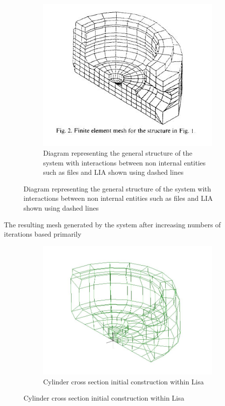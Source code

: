 \begin{figure}
\begin{subfigure}{.5\textwidth}
  \includegraphics[width=0.9\linewidth]{../Graphics/DolsakCylinderMeshed.jpeg}
  \caption{Diagram representing the general structure of the system with interactions between non internal entities such as files and LIA shown using dashed lines}
  \label{fig:sub2}
\end{subfigure}
\label{fig:test}
\end{figure}

The resulting mesh generated by the system after increasing numbers of iterations based primarily

\begin{figure}
\centering
\begin{subfigure}{.5\textwidth}
  \centering
  \includegraphics[width=0.9\linewidth]{../Graphics/DolsakCylinderWithinLisa.jpeg}
  \caption{Cylinder cross section initial construction within Lisa \cite{DolsakPaper91}}
  \label{fig:sub1}
\end{subfigure}%
\label{fig:test}
\end{figure}




